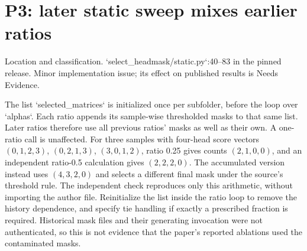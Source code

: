 \documentclass[10pt]{article}
\begin{document}
\section*{P3: later static sweep mixes earlier ratios}
Location and classification. `select\_headmask/static.py`:40–83 in the pinned release. Minor implementation issue; its effect on published results is Needs Evidence.\par
The list `selected\_matrices` is initialized once per subfolder, before the loop over `alphas`. Each ratio appends its sample-wise thresholded masks to that same list. Later ratios therefore use all previous ratios’ masks as well as their own. A one-ratio call is unaffected. For three samples with four-head score vectors \((0,1,2,3)\), \((0,2,1,3)\), \((3,0,1,2)\), ratio 0.25 gives counts \((2,1,0,0)\), and an independent ratio-0.5 calculation gives \((2,2,2,0)\). The accumulated version instead uses \((4,3,2,0)\) and selects a different final mask under the source’s threshold rule. The independent check reproduces only this arithmetic, without importing the author file. Reinitialize the list inside the ratio loop to remove the history dependence, and specify tie handling if exactly a prescribed fraction is required. Historical mask files and their generating invocation were not authenticated, so this is not evidence that the paper’s reported ablations used the contaminated masks.\par
\end{document}
